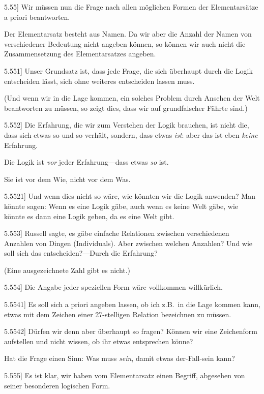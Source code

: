 \documentclass[12pt,oneside]{book}[2007/10/19]
\newcommand{\PropERef}[1]{\hyperref[PropE:#1]{#1}}
\newcommand{\PropositionG}[2]{%
  \item[\phantomsection\label{PropG:#1}\PropERef{#1}] #2%
}
\newcommand{\Emph}[1]{\emph{#1}}%
\newcommand{\zumBeispiel}{z.\;B.}
\begin{document}
\begin{propositions}
\PropositionG{5.55}
{Wir müssen nun die Frage nach allen möglichen
Formen der Elementarsätze a priori beantworten.

Der Elementarsatz besteht aus Namen. Da wir
aber die Anzahl der Namen von verschiedener
Bedeutung nicht angeben können, so können wir
auch nicht die Zusammensetzung des Elementarsatzes
angeben.}


\PropositionG{5.551}
{Unser Grundsatz ist, dass jede Frage, die sich
überhaupt durch die Logik entscheiden lässt, sich
ohne weiteres entscheiden lassen muss.

(Und wenn wir in die Lage kommen, ein solches
Problem durch Ansehen der Welt beantworten zu
müssen, so zeigt dies, dass wir auf grundfalscher
Fährte sind.)}


\PropositionG{5.552}
{Die \glqq{}Erfahrung\grqq{}, die wir zum Verstehen der
Logik brauchen, ist nicht die, dass sich etwas so
und so verhält, sondern, dass etwas \Emph{ist}: aber das
ist eben \Emph{keine} Erfahrung.

Die Logik ist \Emph{vor} jeder Erfahrung---dass etwas
\Emph{so} ist.

Sie ist vor dem Wie, nicht vor dem Was.}


\PropositionG{5.5521}
{Und wenn dies nicht so wäre, wie könnten wir
die Logik anwenden? Man könnte sagen: Wenn
es eine Logik gäbe, auch wenn es keine Welt gäbe,
wie könnte es dann eine Logik geben, da es eine
Welt gibt.}


\PropositionG{5.553}
{Russell sagte, es gäbe einfache Relationen
zwischen verschiedenen Anzahlen von Dingen
(Individuals). Aber zwischen welchen Anzahlen?
Und wie soll sich das entscheiden?---Durch die
Erfahrung?

(Eine ausgezeichnete Zahl gibt es nicht.)}


\PropositionG{5.554}
{Die Angabe jeder speziellen Form wäre vollkommen
willkürlich.}


\PropositionG{5.5541}
{Es soll sich a priori angeben lassen, ob ich \zumBeispiel\ in
die Lage kommen kann, etwas mit dem
Zeichen einer 27-stelligen Relation bezeichnen zu
müssen.}


\PropositionG{5.5542}
{Dürfen wir denn aber überhaupt so fragen?
Können wir eine Zeichenform aufstellen und nicht
wissen, ob ihr etwas entsprechen könne?

Hat die Frage einen Sinn: Was muss \Emph{sein},
damit etwas der-Fall-sein kann?}


\PropositionG{5.555}
{Es ist klar, wir haben vom Elementarsatz einen
Begriff, abgesehen von seiner besonderen logischen
Form.

}
\end{propositions}
\end{document}
